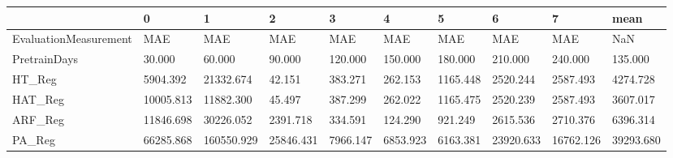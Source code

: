 \begin{tabular}{llllllllll}
\toprule
{} &         0 &          1 &         2 &        3 &        4 &        5 &         6 &         7 &      mean \\
\midrule
EvaluationMeasurement &       MAE &        MAE &       MAE &      MAE &      MAE &      MAE &       MAE &       MAE &       NaN \\
PretrainDays          &    30.000 &     60.000 &    90.000 &  120.000 &  150.000 &  180.000 &   210.000 &   240.000 &   135.000 \\
HT\_Reg                &  5904.392 &  21332.674 &    42.151 &  383.271 &  262.153 & 1165.448 &  2520.244 &  2587.493 &  4274.728 \\
HAT\_Reg               & 10005.813 &  11882.300 &    45.497 &  387.299 &  262.022 & 1165.475 &  2520.239 &  2587.493 &  3607.017 \\
ARF\_Reg               & 11846.698 &  30226.052 &  2391.718 &  334.591 &  124.290 &  921.249 &  2615.536 &  2710.376 &  6396.314 \\
PA\_Reg                & 66285.868 & 160550.929 & 25846.431 & 7966.147 & 6853.923 & 6163.381 & 23920.633 & 16762.126 & 39293.680 \\
\bottomrule
\end{tabular}
